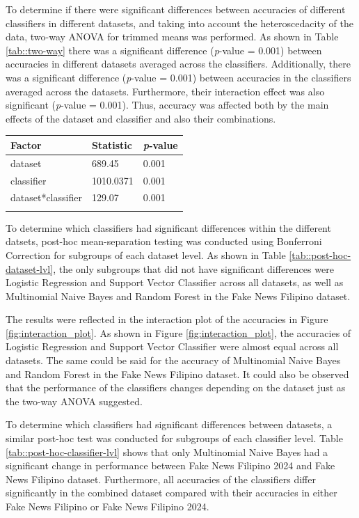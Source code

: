To determine if there were significant differences between accuracies of different classifiers in different datasets, and taking into account the heteroscedacity of the data, two-way ANOVA for trimmed means was performed. As shown in Table \ref{tab::two-way} there was a significant difference (\textit{p}-value = 0.001) between accuracies in different datasets averaged across the classifiers. Additionally, there was a significant difference (\textit{p}-value = 0.001) between accuracies in the classifiers averaged across the datasets. Furthermore, their interaction effect was also significant (\textit{p}-value = 0.001). Thus, accuracy was affected both by the main effects of the dataset and classifier and also their combinations.

\begin{tabularx}{\textwidth}{|l|l|l|}
    \hline
    Factor & Statistic & \textit{p}-value \\
    \hline
    dataset & 689.45 & 0.001 \\
    \hline
    classifier & 1010.0371 & 0.001 \\
    \hline
    dataset*classifier & 129.07 & 0.001 \\
    \hline
\caption{Two-way ANOVA for Trimmed Means.}
\label{tab::two-way}
\end{tabularx}

To determine which classifiers had significant differences within the different datsets, post-hoc mean-separation testing was conducted using Bonferroni Correction for subgroups of each dataset level. As shown in Table \ref{tab::post-hoc-dataset-lvl}, the only subgroups that did not have significant differences were Logistic Regression and Support Vector Classifier across all datasets, as well as Multinomial Naive Bayes and Random Forest in the Fake News Filipino dataset.

The results were reflected in the interaction plot of the accuracies in Figure \ref{fig:interaction_plot}. As shown in Figure \ref{fig:interaction_plot}, the accuracies of Logistic Regression and Support Vector Classifier were almost equal across all datasets. The same could be said for the accuracy of Multinomial Naive Bayes and Random Forest in the Fake News Filipino dataset. It could also be observed that the performance of the classifiers changes depending on the dataset just as the two-way ANOVA suggested.

To determine which classifiers had significant differences between datasets, a similar post-hoc test was conducted for subgroups of each classifier level. Table \ref{tab::post-hoc-classifier-lvl} shows that only Multinomial Naive Bayes had a significant change in performance between Fake News Filipino 2024 and Fake News Filipino dataset. Furthermore, all accuracies of the classifiers differ significantly in the combined dataset compared with their accuracies in either Fake News Filipino or Fake News Filipino 2024.

